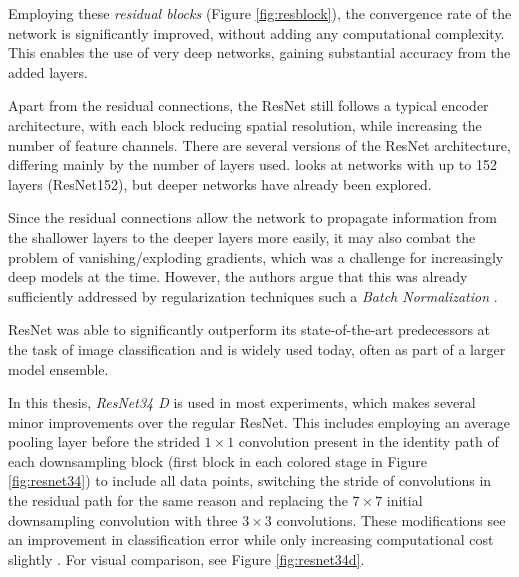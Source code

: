 Employing these \emph{residual blocks} (Figure \ref{fig:resblock}), the convergence rate of the network is significantly improved, without adding any computational complexity. 
This enables the use of very deep networks, gaining substantial accuracy from the added layers.

Apart from the residual connections, the ResNet still follows a typical encoder architecture, with each block reducing spatial resolution, while increasing the number of feature channels.
There are several versions of the ResNet architecture, differing mainly by the number of layers used. 
 looks at networks with up to 152 layers (ResNet152), but deeper networks have already been explored. 

Since the residual connections allow the network to propagate information from the shallower layers to the deeper layers more easily, it may also combat the problem of vanishing/exploding gradients, which was a challenge for increasingly deep models at the time. 
However, the authors argue that this was already sufficiently addressed by regularization techniques such a \emph{Batch Normalization} \cite{ioffeBatchNormalizationAccelerating2015}.

ResNet was able to significantly outperform its state-of-the-art predecessors at the task of image classification and is widely used today, often as part of a larger model ensemble.

In this thesis, \emph{ResNet34 D} is used in most experiments, which makes several minor improvements over the regular ResNet.
This includes employing an average pooling layer before the strided $1\times 1$ convolution present in the identity path of each downsampling block (first block in each colored stage in Figure \ref{fig:resnet34}) to include all data points, switching the stride of convolutions in the residual path for the same reason and replacing the $7\times 7$ initial downsampling convolution with three $3\times 3$ convolutions.
These modifications see an improvement in classification error while only increasing computational cost slightly \cite{heBagTricksImage2018}. For visual comparison, see Figure \ref{fig:resnet34d}.

